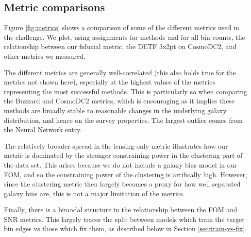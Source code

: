 \documentclass[twocolumn,twocolappendix]{aastex63}
\begin{document}
\subsection{Metric comparisons} \label{sec:metric-results}
Figure \ref{fig:metrics} shows a comparison of some of the different metrics used in the challenge.
We plot, using assignments for methods and for all bin counts, the relationship between our fiducial
metric, the DETF 3x2pt on CosmoDC2, and other metrics we measured.

The different metrics are generally well-correlated (this also holds true for the metrics not 
shown here), especially at the highest values of the metrics representing the most successful
methods. This is particularly so when comparing the Buzzard and CosmoDC2 metrics, which is encouraging 
as it implies these methods are broadly stable to reasonable changes in the underlying galaxy
distribution, and hence on the survey properties.  The largest outlier comes from the 
{\sc Neural Network} entry.

The relatively broader spread in the lensing-only metric illustrates how our metric is dominated
by the stronger constraining power in the clustering part of the data set.  This arises because
we do not include a galaxy bias model in our FOM, and so the constraining power of the clustering
is artifically high.
However, since the clustering metric then largely becomes a proxy for how well separated
galaxy bins are, this is not a major limitation of the metrics.

Finally, there is a bimodal structure in the relationship between the FOM and SNR metrics.
This largely traces the split between models which train the target bin edges vs those
which fix them, as described below in Section \ref{sec:train-vs-fix}.
\end{document}
